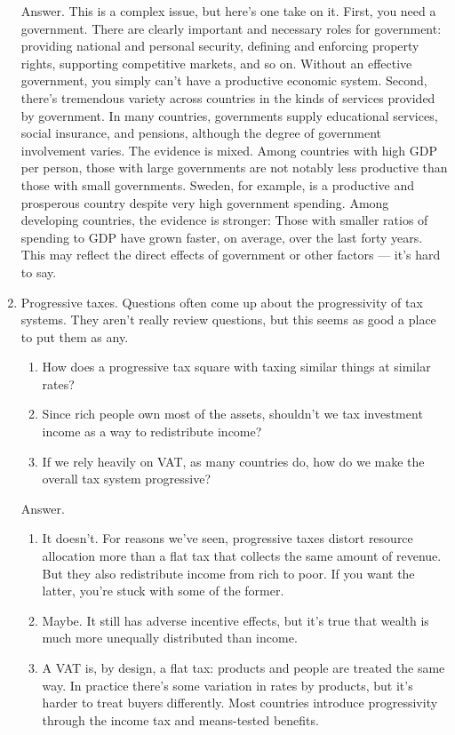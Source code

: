\begin{enumerate}
Answer.  This is a complex issue, but here's one take on it.  First,
you need a government. There are clearly important and necessary
roles for government: providing national and personal security,
defining and enforcing property rights, supporting competitive
markets, and so on. Without an effective government, you simply
can't have a productive economic system. Second, there's tremendous
variety across countries in the kinds of services provided by
government.
In many countries, governments supply educational
services, social insurance, and pensions, although the degree of
government involvement varies. The evidence is mixed.  Among
countries with high GDP per person, those with large governments are
not notably less productive than those with small governments.
Sweden, for example, is a productive and prosperous country despite very high
government spending. Among developing countries, the evidence is
stronger: Those with smaller ratios of spending to GDP have grown faster,
on average, over the last forty years. This may reflect the direct
effects of government or other factors --- it's hard to say.

\item Progressive taxes.  Questions often come up about the progressivity
of tax systems.
They aren't really review questions, but this seems as good a place to put them
as any.
\begin{enumerate}
\item How does a progressive tax square with taxing similar things at similar rates?
\item Since rich people own most of the assets, shouldn't we tax investment income
as a way to redistribute income?
\item If we rely heavily on VAT, as many countries do,
 how do we make the overall tax system progressive?
\end{enumerate}

Answer.
\begin{enumerate}
\item It doesn't.
For reasons we've seen, progressive taxes distort resource allocation more than a flat tax that collects
the same amount of revenue.
But they also redistribute income from rich to poor.
If you want the latter, you're stuck with some of the former.
\item Maybe.  It still has adverse incentive effects, but it's true that
wealth is much more unequally distributed than income.
\item A VAT is, by design, a flat tax:  products and people are treated the same way.
In practice there's some variation in rates by products, but it's harder to
treat buyers differently.
Most countries introduce progressivity through the income tax and means-tested benefits.
\end{enumerate}
\end{enumerate}



